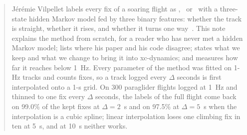 \begin{abstract}
\noindent
Jérémie Vilpellet labels every fix of a soaring flight as \tr, \se\ or \cl\ with a three-state
hidden Markov model fed by three binary features: whether the track is straight, whether it rises,
and whether it turns one way~\cite{vilpellet2026,vilpellet2025}. This note explains the method from
scratch, for a reader who has never met a hidden Markov model; lists where his paper and his code
disagree; states what we keep and what we change to bring it into xc-dynamics; and measures how
far it reaches below 1~Hz. Every parameter of the method was fitted on 1-Hz tracks and counts
fixes, so a track logged every $\Delta$ seconds is first interpolated onto a 1-s grid. On 300
paraglider flights logged at 1~Hz and thinned to one fix every $\Delta$ seconds, the labels of the
full flight come back on 99.0\% of the kept fixes at $\Delta=2$~s and on 97.5\% at $\Delta=5$~s
when the interpolation is a cubic spline; linear interpolation loses one climbing fix in ten at
5~s, and at 10~s neither works.
\end{abstract}
